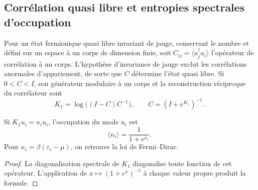 \subsection{Corrélation quasi libre et entropies spectrales d’occupation}
\label{v:v:rec:cuasilibre:section:01}

Pour un état fermionique quasi libre invariant de jauge, conservant le
nombre et défini sur un espace à un corps de dimension finie, soit
\(C_{ij}=\langle a_j^\dagger a_i\rangle\) l’opérateur de corrélation à un
corps. L’hypothèse d’invariance de jauge exclut les corrélations anormales
d’appariement, de sorte que \(C\) détermine l’état quasi libre. Si
\(0<C<I\), son générateur modulaire à un corps et la reconstruction réciproque
du corrélateur sont
\begin{equation}
 \boxed{
 K_1=\log\bigl((I-C)C^{-1}\bigr),
 \qquad
 C=(I+e^{K_1})^{-1}.}
 \label{v:v:rec:eq:puente-cuasilibre-modular-rev3}
\end{equation}

\begin{corollary}
\label{v:v:rec:cor:forma-logistica-modular-rev3}
Si \(K_1u_i=\kappa_i u_i\), l’occupation du mode \(u_i\) est
\[
 \langle n_i\rangle=\frac1{1+e^{\kappa_i}}.
\]
Pour \(\kappa_i=\beta(\varepsilon_i-\mu)\), on retrouve la loi de
Fermi--Dirac.
\end{corollary}

\begin{proof}
La diagonalisation spectrale de \(K_1\) diagonalise toute fonction de cet opérateur.
L’application de \(x\mapsto(1+e^x)^{-1}\) à chaque valeur propre produit la formule.
\end{proof}

